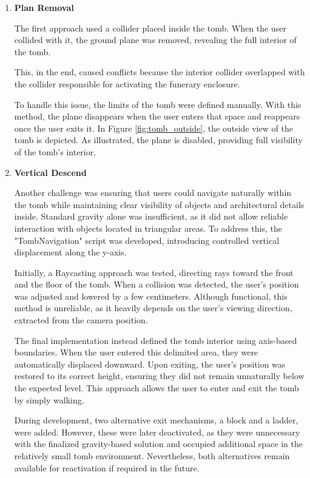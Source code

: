 \begin{enumerate}
\item{\textbf{Plan Removal}

The first approach used a collider placed inside the tomb. When the user collided with it, the ground plane was removed, revealing the full interior of the tomb.

This, in the end, caused conflicts because the interior collider overlapped with the collider responsible for activating the funerary enclosure.

To handle this issue, the limits of the tomb were defined manually. With this method, the plane disappears when the user enters that space and reappears once the user exits it.
In Figure \ref{fig:tomb_outside}, the outside view of the tomb is depicted. As illustrated, the plane is disabled, providing full visibility of the tomb’s interior.
}
\item{
\textbf{Vertical Descend}

Another challenge was ensuring that users could navigate naturally within the tomb while maintaining clear visibility of objects and architectural details inside. Standard gravity alone was insufficient, as it did not allow reliable interaction with objects located in triangular areas.
To address this, the "TombNavigation" script was developed, introducing controlled vertical displacement along the y-axis.

Initially, a Raycasting approach was tested, directing rays toward the front and the floor of the tomb. When a collision was detected, the user’s position was adjusted and lowered by a few centimeters. Although functional, this method is unreliable, as it heavily depends on the user’s viewing direction, extracted from the camera position.

The final implementation instead defined the tomb interior using axis-based boundaries. When the user entered this delimited area, they were automatically displaced downward. Upon exiting, the user’s position was restored to its correct height, ensuring they did not remain unnaturally below the expected level. This approach allows the user to enter and exit the tomb by simply walking.

During development, two alternative exit mechanisms, a block and a ladder, were added. However, these were later deactivated, as they were unnecessary with the finalized gravity-based solution and occupied additional space in the relatively small tomb environment. Nevertheless, both alternatives remain available for reactivation if required in the future.
}
\end{enumerate}

